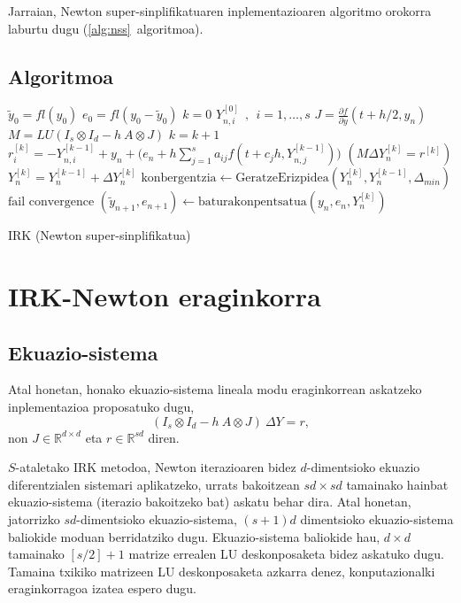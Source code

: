 Jarraian, Newton super-sinplifikatuaren inplementazioaren algoritmo orokorra laburtu dugu (\ref{alg:nss}~algoritmoa).

\subsection*{Algoritmoa}

\begin{algorithm}[H]
 \BlankLine
  $\tilde{y}_0=fl(y_0)$\;
  $e_0=fl(y_0-\tilde{y}_0)$\;
  {
   \BlankLine
   $k=0$\;
    $Y_{n,i}^{[0]} \ \ , \ \ i=1,\dots,s $\;
   \BlankLine
   $J=\frac{\partial f}{\partial y}(t+h/2,y_n) $\; 
   $M=LU(I_s \otimes I_d - h \ A \otimes J)$\;
   \BlankLine
   {
    \BlankLine 
    $k=k+1$\;
    $r_i^{[k]}=-Y_{n,i}^{[k-1]}+y_n+\big(e_n+h \sum\limits_{j=1}^{s} a_{ij} f(t+c_jh,Y_{n,j}^{[k-1]})\big) $\;
     $(M \Delta Y_n^{[k]}=r^{[k]})$\;
    $Y_n^{[k]}=Y_n^{[k-1]}+\Delta Y_n^{[k]}$\;
    $\text{konbergentzia} \leftarrow \text{GeratzeErizpidea}(Y_n^{[k]},Y_n^{[k-1]},\Delta_{min}) $\;
   }
   \BlankLine
   {
     {$\text{fail convergence}$\;}
   }
   {$(\tilde y_{n+1},e_{n+1})\leftarrow \text{baturakonpentsatua}(y_n,e_n,Y_n^{[k]})$\;}    
 }
 \caption{IRK (Newton super-sinplifikatua)}
 \label{alg:nss}
\end{algorithm}



\section{IRK-Newton eraginkorra}
\label{sec:7.3}

\subsection{Ekuazio-sistema}

Atal honetan, honako ekuazio-sistema lineala modu eraginkorrean askatzeko inplementazioa proposatuko dugu,
\begin{equation}
\label{eq:linsys}
(I_s \otimes I_d - h \ A \otimes J) \ \Delta Y = r,
\end{equation}
non $J \in \mathbb{R}^{d \times d}$  eta $r \in \mathbb{R}^{sd}$ diren.

$S$-ataletako IRK metodoa, Newton iterazioaren bidez $d$-dimentsioko ekuazio diferentzialen sistemari aplikatzeko, urrats bakoitzean $sd \times sd$ tamainako hainbat ekuazio-sistema (iterazio bakoitzeko bat) askatu behar dira. Atal honetan, jatorrizko $sd$-dimentsioko ekuazio-sistema, $(s+1)d$ dimentsioko ekuazio-sistema baliokide moduan berridatziko dugu. Ekuazio-sistema baliokide hau,  $d \times d$ tamainako $[s/2]+1$ matrize errealen LU deskonposaketa bidez askatuko dugu. Tamaina txikiko matrizeen LU deskonposaketa azkarra denez, konputazionalki eraginkorragoa izatea espero dugu.      

